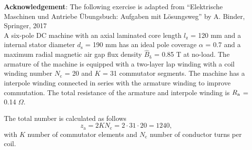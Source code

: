 

\normalsize{\textbf{Acknowledgement}: The following exercise is adapted from ``Elektrische Maschinen und Antriebe Übungsbuch: Aufgaben mit Lösungsweg'' by A. Binder, Springer, 2017}\\




A six-pole DC machine with an axial laminated core length $l_{\mathrm{z}}$ = 120 mm and a internal stator diameter $d_{\mathrm{s}}$ = 190 mm has an ideal pole coverage $\alpha$ = 0.7 and a maximum radial magnetic air gap flux density $\hat{B}_{\updelta}$ = 0.85 T at no-load. The armature of the machine is equipped with a two-layer lap winding with a coil winding number $N_{\mathrm{c}}$ = 20 and $K$ = 31 commutator segments.
The machine has a interpole winding connected in series with the armature winding to improve commutation. The total resistance of the armature and interpole winding is $R_{\mathrm{a}}$ = 0.14 $\Omega$.



\begin{solutionblock}
    The total number is calculated as follows
    \begin{equation}
        z_{\mathrm{a}} = 2 K N_{\mathrm{c}}
        = 2 \cdot 31 \cdot 20
        = 1240,
    \end{equation}
    with $K$ number of commutator elements and $N_{\mathrm{c}}$ number of conductor turns per coil.

\end{solutionblock}



